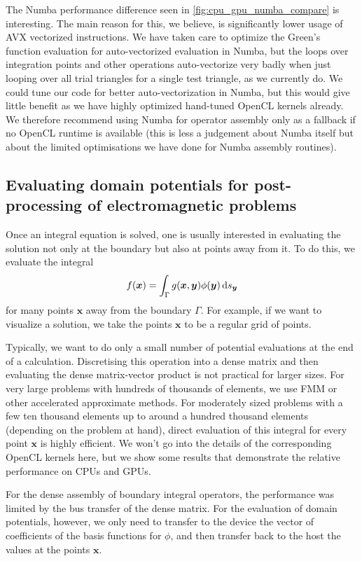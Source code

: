 \documentclass{IEEEcsmag}
\newcommand{\bvec}[1]{\boldsymbol{#1}}
\def\bx{\bvec{x}}
\def\by{\bvec{y}}
\newcommand{\ds}[1][]{\,\mathrm{d}s\ifthenelse{\equal{#1}{}}{}{_{#1}}}
\begin{document}
The Numba performance difference seen in \cref{fig:cpu_gpu_numba_compare} is interesting. The main reason for this, we believe, is significantly lower usage of AVX vectorized instructions. We have taken care to optimize the Green's function evaluation for auto-vectorized evaluation in Numba, but the loops over integration points and other operations auto-vectorize very badly when just looping over all trial triangles for a single test triangle, as we currently do. We could tune our code for better auto-vectorization in Numba, but this would give little benefit as we have highly optimized hand-tuned OpenCL kernels already. We therefore recommend using Numba for operator assembly only as a fallback if no OpenCL runtime is available (this is less a judgement about Numba itself but about the limited optimisations we have done for Numba assembly routines).

\subsection{Evaluating domain potentials for post-processing of electromagnetic problems}
Once an integral equation is solved, one is usually interested in evaluating the solution not only at the boundary but also at points away from it. To do this, we evaluate the integral
$$
f(\bx) = \int_{\Gamma}g(\bx, \by)\phi(\by) \ds[\by]
$$
for many points $\bx$ away from the boundary $\Gamma$. For example, if we want to visualize a solution, we take the points $\bx$ to be a regular grid of points.

Typically, we want to do only a small number of potential evaluations at the end of a calculation. Discretising this operation into a dense matrix and then evaluating the dense matrix-vector product is not practical for larger sizes. For very large problems with hundreds of thousands of elements, we use FMM or other accelerated approximate methods. For moderately sized problems with a few ten thousand elements up to around a hundred thousand elements (depending on the problem at hand), direct evaluation of this integral for every point $\bx$ is highly efficient. We won't go into the details of the corresponding OpenCL kernels here, but we show some results that demonstrate the relative performance on CPUs and GPUs.

For the dense assembly of boundary integral operators, the performance was limited by the bus transfer of the dense matrix. For the evaluation of domain potentials, however, we only need to transfer to the device the vector of coefficients of the basis functions for $\phi$, and then transfer back to the host the values at the points $\bx$.
\end{document}
